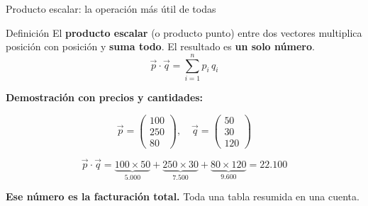\documentclass[aspectratio=169,10pt]{beamer}
\begin{document}
\begin{frame}{Producto escalar: la operación más útil de todas}

\begin{block}{Definición}
El \textbf{producto escalar} (o producto punto) entre dos vectores multiplica posición con
posición y \textbf{suma todo}. El resultado es \textbf{un solo número}.
$$\vec{p} \cdot \vec{q} = \sum_{i=1}^{n} p_i \, q_i$$
\end{block}

\vspace{0.3cm}
\textbf{Demostración con precios y cantidades:}

$$\vec{p} = \begin{pmatrix} 100 \\ 250 \\ 80 \end{pmatrix}, \quad
\vec{q} = \begin{pmatrix} 50 \\ 30 \\ 120 \end{pmatrix}$$

$$\vec{p} \cdot \vec{q} = \underbrace{100 \times 50}_{5.000} + \underbrace{250 \times 30}_{7.500}
+ \underbrace{80 \times 120}_{9.600} = 22.100$$

\vspace{0.2cm}
\begin{center}
\textbf{Ese número es la facturación total.} Toda una tabla resumida en una cuenta.
\end{center}
\end{frame}
\end{document}
